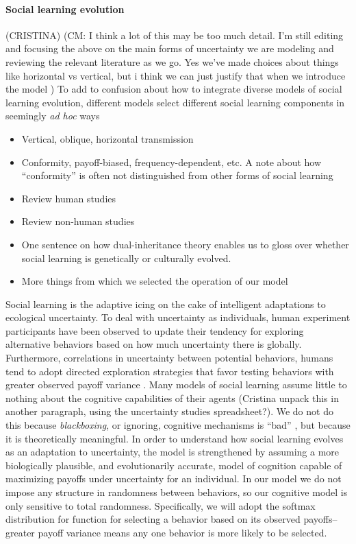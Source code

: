 \documentclass[letterpaper,11.5pt]{scrartcl}
\newcommand{\cm}[1]{{\textcolor{mypurple} {({\tiny CM:} #1)}}}
\begin{document}
\paragraph{Social learning evolution} (CRISTINA) 
\cm{I think a lot of this may be too much detail. I'm still editing and focusing the above on the main forms of uncertainty we are modeling and reviewing the relevant literature as we go. Yes we've made choices about things like horizontal vs vertical, but i think we can just justify that when we introduce the model }
To add to confusion about how to integrate diverse models of social learning
evolution, different models select different social learning components in
seemingly \emph{ad hoc} ways 
\begin{itemize}
  \item 
    Vertical, oblique, horizontal transmission
  \item
    Conformity, payoff-biased, frequency-dependent, etc. A note about how
    ``conformity'' is often not distinguished from other forms of social learning
  \item
    Review human studies
  \item
    Review non-human studies~\cite{Leris2016,Aplin2017,Avargues-Weber2018,Baracchi2018}
  \item
    One sentence on how dual-inheritance theory enables us to gloss over whether
    social learning is genetically or culturally evolved.
  \item
    More things from which we selected the operation of our model
\end{itemize}

Social learning is the adaptive icing on the cake of intelligent adaptations to ecological uncertainty. To deal with uncertainty as individuals, human experiment participants have been observed to update their tendency for exploring alternative behaviors based on how much uncertainty there is globally. Furthermore, correlations in uncertainty between potential behaviors, humans tend to adopt directed exploration strategies that favor testing behaviors with greater observed payoff variance \cite{Wilson2014,Gershman2019}. Many models of social learning assume little to nothing about the cognitive capabilities of their agents (Cristina unpack this in another paragraph, using the uncertainty studies spreadsheet?). We do not do this because \emph{blackboxing}, or ignoring, cognitive mechanisms is “bad” \cite[p. 658]{Heyes2016, Kendal2018}, but because it is theoretically meaningful. In order to understand how social learning evolves as an adaptation to uncertainty, the model is strengthened by assuming a more biologically plausible, and evolutionarily accurate, model of cognition capable of maximizing payoffs under uncertainty for an individual. In our model we do not impose any structure in randomness between behaviors, so our cognitive model is only sensitive to total randomness. Specifically, we will adopt the softmax distribution for function for selecting a behavior based on its observed payoffs–greater payoff variance means any one behavior is more likely to be selected.
\end{document}
